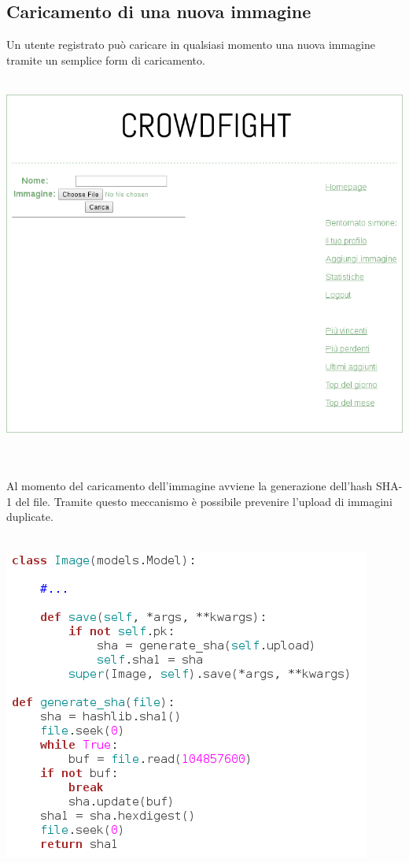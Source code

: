 \documentclass{scrreprt}
\begin{document}
\subsection{Caricamento di una nuova immagine}
Un utente registrato può caricare in qualsiasi momento una nuova immagine tramite un semplice form di caricamento.\\\\
\centerline{\includegraphics[scale=0.46]{upload}}
\\\\
Al momento del caricamento dell'immagine avviene la generazione dell'hash SHA-1 del file. Tramite questo meccanismo è possibile prevenire l'upload di immagini duplicate.
\\\\
\centerline{\includegraphics[scale=0.40]{codehash}}
\pagebreak
\end{document}
